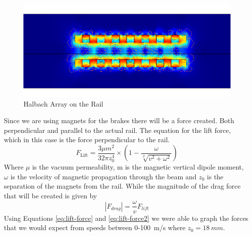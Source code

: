 \documentclass[main.tex]{subfiles}
\begin{document}
    \begin{figure}[H]
        \centering
        \includegraphics[width=\linewidth]{images/halbach_array.png}
        \caption{Halbach Array on the Rail}
        \label{fig:halbach-array}
    \end{figure}
     Since we are using magnets for the brakes there will be a force created. Both perpendicular and parallel to the actual rail. The equation for the lift force, which in this case is the force perpendicular to the rail.
     \begin{equation}\label{eq:lift-force}
     F_{\textrm{Lift}} = \frac{3\mu m^2}{32\pi z_0^4}\times\left(1 -\frac{\omega}{\sqrt[2]{v^2+\omega^2}}\right)
    \end{equation}
    Where $\mu$ is the vacuum permeability, m is the magnetic vertical dipole moment, $\omega$ is the velocity of magnetic propagation through the beam and $z_0$ is the separation of the magnets from the rail. While the magnitude of the drag force that will be created is given by
    \begin{equation}\label{eq:lift-force2}
    \left\lvert F_{drag}\right\rvert = \frac{\omega}{v} F_{lift}
    \end{equation}
     Using Equations \ref{eq:lift-force} and \ref{eq:lift-force2} we were able to graph the forces that we would expect from speeds between 0-\SI{100}{m/s} where $z_0 = \SI{18}{mm}$.\\
\end{document}
